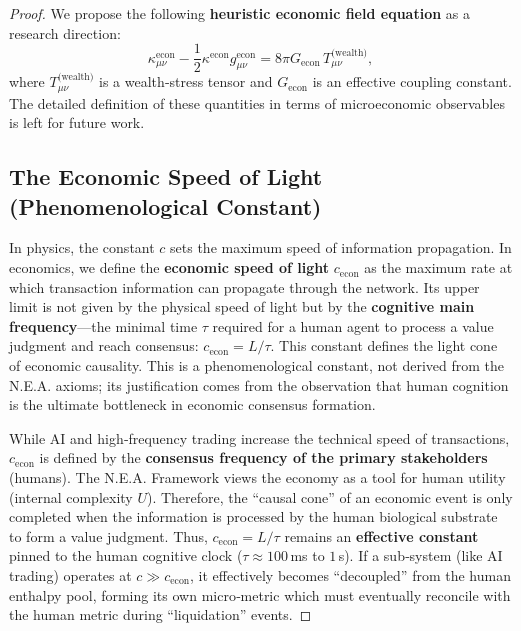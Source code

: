\documentclass{article}
\begin{document}
\begin{proof}
We propose the following \textbf{heuristic economic field equation} as a research direction:
\[
\kappa_{\mu\nu}^{\text{econ}} - \frac12 \kappa^{\text{econ}} g_{\mu\nu}^{\text{econ}} = 8\pi G_{\text{econ}} \, T_{\mu\nu}^{\text{(wealth)}},
\]
where $T_{\mu\nu}^{\text{(wealth)}}$ is a wealth‑stress tensor and $G_{\text{econ}}$ is an effective coupling constant. The detailed definition of these quantities in terms of microeconomic observables is left for future work.

\subsection{The Economic Speed of Light (Phenomenological Constant)}
In physics, the constant $c$ sets the maximum speed of information propagation. In economics, we define the \textbf{economic speed of light} $c_{\text{econ}}$ as the maximum rate at which transaction information can propagate through the network. Its upper limit is not given by the physical speed of light but by the \textbf{cognitive main frequency}—the minimal time $\tau$ required for a human agent to process a value judgment and reach consensus: $c_{\text{econ}} = L / \tau$. This constant defines the light cone of economic causality. This is a phenomenological constant, not derived from the N.E.A. axioms; its justification comes from the observation that human cognition is the ultimate bottleneck in economic consensus formation.

While AI and high‑frequency trading increase the technical speed of transactions, $c_{\text{econ}}$ is defined by the \textbf{consensus frequency of the primary stakeholders} (humans). The N.E.A. Framework views the economy as a tool for human utility (internal complexity $U$). Therefore, the “causal cone” of an economic event is only completed when the information is processed by the human biological substrate to form a value judgment. Thus, $c_{\text{econ}} = L/\tau$ remains an \textbf{effective constant} pinned to the human cognitive clock ($\tau \approx 100$ ms to $1$ s). If a sub‑system (like AI trading) operates at $c \gg c_{\text{econ}}$, it effectively becomes “decoupled” from the human enthalpy pool, forming its own micro‑metric which must eventually reconcile with the human metric during “liquidation” events.


\end{proof}
\end{document}
